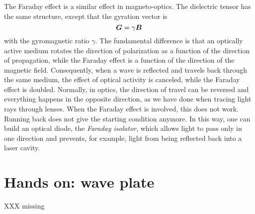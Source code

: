 The Faraday effect is a similar effect in magneto-optics. The dielectric tensor has the same structure, except that the gyration vector is
\begin{equation}
    \boldsymbol{G} = \gamma \boldsymbol{B}
\end{equation}
with the gyromagnetic ratio $\gamma$. The fundamental difference is that an optically active medium rotates the direction of polarization as a function of the direction of propagation, while the Faraday effect is a function of the direction of the magnetic field. Consequently, when a wave is reflected and travels back through the same medium, the effect of optical activity is canceled, while the Faraday effect is doubled. Normally, in optics, the direction of travel can be reversed and everything happens in the opposite direction, as we have done when tracing light rays through lenses. When the Faraday effect is involved, this does not work. Running back does not give the starting condition anymore. In this way, one can build an optical diode, the \emph{Faraday isolator}, which allows light to pass only in one direction and prevents, for example, light from being reflected back into a laser cavity.

\section{Hands on: wave plate}

 XXX missing




\printbibliography[segment=\therefsegment,heading=subbibliography]
